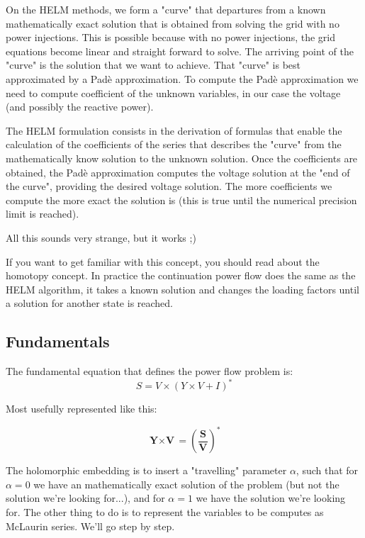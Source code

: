 \documentclass[11pt,fleqn]{book} %
\begin{document}
On the HELM methods, we form a "curve" that departures from a known mathematically exact solution that is obtained from solving the grid with no power injections. This is possible because with no power injections, the grid equations become linear and straight forward to solve. The arriving point of the "curve" is the solution that we want to achieve. That "curve" is best approximated by a Padè approximation. To compute the Padè approximation we need to compute coefficient of the unknown variables, in our case the voltage (and possibly the reactive power).

The HELM formulation consists in the derivation of formulas that enable the calculation of the coefficients of the series that describes the "curve" from the mathematically know solution to the unknown solution. Once the coefficients are obtained, the Padè approximation computes the voltage solution at the "end of the curve", providing the desired voltage solution. The more coefficients we compute the more exact the solution is (this is true until the numerical precision limit is reached).\newline 


All this sounds very strange, but it works ;)\newline 


If you want to get familiar with this concept, you should read about the homotopy concept. In practice the continuation power flow does the same as the HELM algorithm, it takes a known solution and changes the loading factors until a solution for another state is reached.

\subsection{Fundamentals}

The fundamental equation that defines the power flow problem is:
\begin{equation}
S = V \times (Y \times V + I)^*
\end{equation}

Most usefully represented like this:


\begin{equation}
{\textbf{Y} \times \textbf{V}} = \left(\frac{\textbf{S}}{\textbf{V}}\right)^* 
\label{base_eq}
\end{equation}


The holomorphic embedding is to insert a "travelling" parameter $\alpha$, such that for $\alpha=0$ we have an mathematically exact solution of the problem (but not the solution we're looking for...), and for $\alpha=1$ we have the solution we're looking for. The other thing to do is to represent the variables to be computes as McLaurin series. We'll go step by step.\newline
\end{document}
